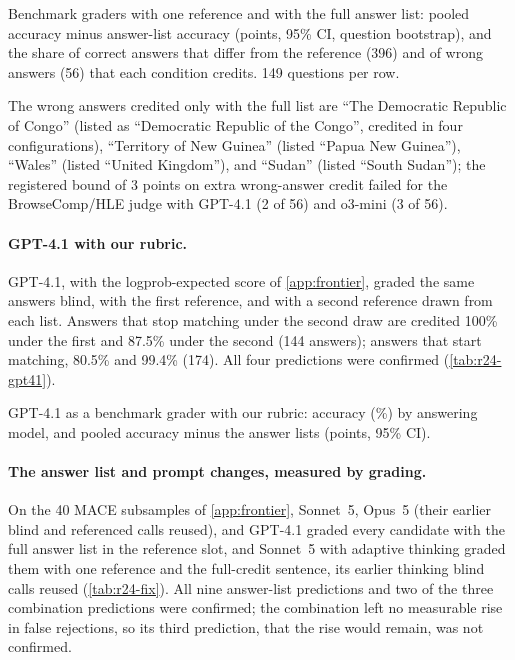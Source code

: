 \begin{table}[htbp]
\centering
\caption{Benchmark graders with one reference and with the full answer list: pooled accuracy minus answer-list accuracy (points, 95\% CI, question bootstrap), and the share of correct answers that differ from the reference (396) and of wrong answers (56) that each condition credits. 149 questions per row.\pre}
\label{tab:r24-standard}
\footnotesize
\setlength{\tabcolsep}{3pt}
\begin{adjustbox}{max width=\linewidth}\end{adjustbox}
\end{table}

The wrong answers credited only with the full list are ``The Democratic Republic of Congo'' (listed as ``Democratic Republic of the Congo'', credited in four configurations), ``Territory of New Guinea'' (listed ``Papua New Guinea''), ``Wales'' (listed ``United Kingdom''), and ``Sudan'' (listed ``South Sudan''); the registered bound of 3 points on extra wrong-answer credit failed for the BrowseComp/HLE judge with GPT-4.1 (2 of 56) and o3-mini (3 of 56).

\paragraph{GPT-4.1 with our rubric.} GPT-4.1, with the logprob-expected score of \cref{app:frontier}, graded the same answers blind, with the first reference, and with a second reference drawn from each list. Answers that stop matching under the second draw are credited 100\% under the first and 87.5\% under the second (144 answers); answers that start matching, 80.5\% and 99.4\% (174). All four predictions were confirmed (\cref{tab:r24-gpt41}).

\begin{table}[htbp]
\centering
\caption{GPT-4.1 as a benchmark grader with our rubric: accuracy (\%) by answering model, and pooled accuracy minus the answer lists (points, 95\% CI).\pre}
\label{tab:r24-gpt41}
\footnotesize

\end{table}

\paragraph{The answer list and prompt changes, measured by grading.} On the 40 \textsc{MACE} subsamples of \cref{app:frontier}, Sonnet~5, Opus~5 (their earlier blind and referenced calls reused), and GPT-4.1 graded every candidate with the full answer list in the reference slot, and Sonnet~5 with adaptive thinking graded them with one reference and the full-credit sentence, its earlier thinking blind calls reused (\cref{tab:r24-fix}). All nine answer-list predictions and two of the three combination predictions were confirmed; the combination left no measurable rise in false rejections, so its third prediction, that the rise would remain, was not confirmed.

